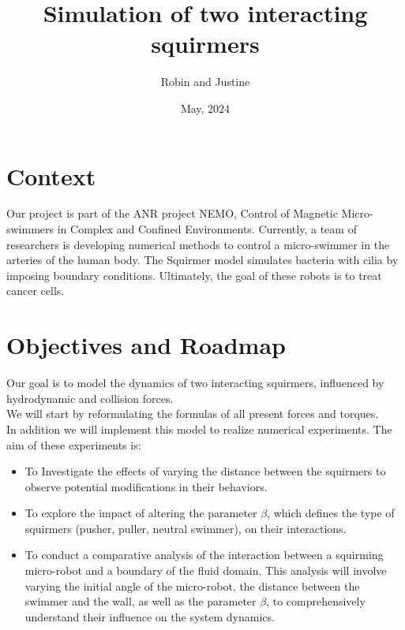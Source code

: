 \documentclass{article}
\begin{document}
\title{Simulation of two interacting squirmers}
\author{Robin and Justine}
\date{May, 2024}
\maketitle

\section{Context}
Our project is part of the ANR project NEMO, Control of Magnetic Micro-swimmers in Complex and Confined Environments.
Currently, a team of researchers is developing numerical methods to control a micro-swimmer in the arteries
of the human body.
The Squirmer model simulates bacteria with cilia by imposing boundary conditions.
Ultimately, the goal of these robots is to treat cancer cells.

\vspace{0.5cm}
\section{Objectives and Roadmap}
Our goal is to model the dynamics of two interacting squirmers, influenced by hydrodynamic \cite{Brumley} and collision forces.\\
We will start by reformulating the formulas of all present forces and torques.\cite{Brumley}\cite{Lauga}\\
In addition we will implement this model to realize numerical experiments. The aim of these experiments is: 
\begin{itemize}
    \item To Investigate the effects of varying the distance between the squirmers to observe
    potential modifications in their behaviors.
    \item To explore the impact of altering the parameter $\beta$, which defines the
    type of squirmers (pusher, puller, neutral swimmer), on their interactions.
    \item To conduct a comparative analysis of the interaction between a squirming micro-robot and a 
    boundary of the fluid domain. This analysis will involve varying the initial angle of the micro-robot, the distance between the swimmer and the wall, as well as the parameter $\beta$, 
    to comprehensively understand their influence on the system dynamics.
\end{itemize}

\newpage
\end{document}
